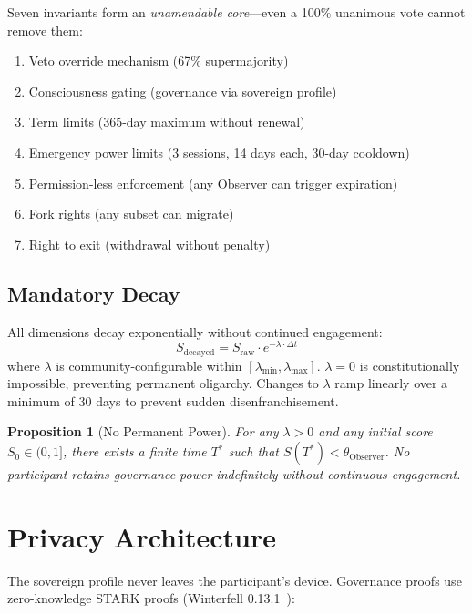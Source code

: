 \documentclass[11pt,twocolumn]{article}
\newtheorem{proposition}{Proposition}
\begin{document}
Seven invariants form an \emph{unamendable core}---even a 100\% unanimous vote cannot remove them:
\begin{enumerate}[nosep]
  \item Veto override mechanism (67\% supermajority)
  \item Consciousness gating (governance via sovereign profile)
  \item Term limits (365-day maximum without renewal)
  \item Emergency power limits (3 sessions, 14 days each, 30-day cooldown)
  \item Permission-less enforcement (any Observer can trigger expiration)
  \item Fork rights (any subset can migrate)
  \item Right to exit (withdrawal without penalty)
\end{enumerate}

\subsection{Mandatory Decay}

All dimensions decay exponentially without continued engagement:
\begin{equation}
S_{\text{decayed}} = S_{\text{raw}} \cdot e^{-\lambda \cdot \Delta t}
\end{equation}
where $\lambda$ is community-configurable within $[\lambda_{\min}, \lambda_{\max}]$. $\lambda = 0$ is constitutionally impossible, preventing permanent oligarchy. Changes to $\lambda$ ramp linearly over a minimum of 30 days to prevent sudden disenfranchisement.

\begin{proposition}[No Permanent Power]
For any $\lambda > 0$ and any initial score $S_0 \in (0,1]$, there exists a finite time $T^*$ such that $S(T^*) < \theta_{\text{Observer}}$. No participant retains governance power indefinitely without continuous engagement.
\end{proposition}

\section{Privacy Architecture}
\label{sec:privacy}

The sovereign profile never leaves the participant's device. Governance proofs use zero-knowledge STARK proofs (Winterfell 0.13.1~\citep{winterfell2023}):
\end{document}
